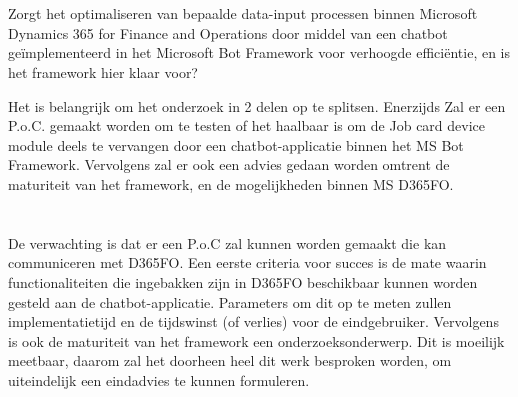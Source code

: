 \section{}
\label{sec:onderzoeksvraag}
Zorgt het optimaliseren van bepaalde data-input processen binnen Microsoft Dynamics 365 for Finance and Operations door middel van een chatbot geïmplementeerd in het Microsoft Bot Framework voor verhoogde efficiëntie, en is het framework hier klaar voor? 


Het is belangrijk om het onderzoek in 2 delen op te splitsen. Enerzijds Zal er een P.o.C. gemaakt worden om te testen of het haalbaar is om de Job card device module deels te vervangen door een chatbot-applicatie binnen het MS Bot Framework. Vervolgens zal er ook een advies gedaan worden omtrent de maturiteit van het framework, en de mogelijkheden binnen MS D365FO. 

\section{}
\label{sec:onderzoeksdoelstelling}

De verwachting is dat er een P.o.C zal kunnen worden gemaakt die kan communiceren met D365FO. Een eerste criteria voor succes is de mate waarin functionaliteiten die ingebakken zijn in D365FO beschikbaar kunnen worden gesteld aan de chatbot-applicatie. Parameters om dit op te meten zullen implementatietijd en de tijdswinst (of verlies) voor de eindgebruiker. Vervolgens is ook de maturiteit van het framework een onderzoeksonderwerp. Dit is moeilijk meetbaar, daarom zal het doorheen heel dit werk besproken worden, om uiteindelijk een eindadvies te kunnen formuleren. 


